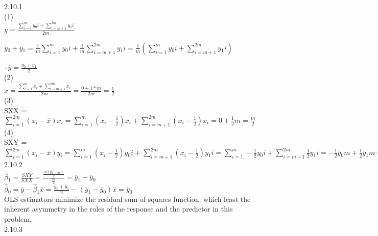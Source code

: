 \documentclass[12pt]{article}
\begin{document}
2.10.1\\

(1)\\

$\overline{y} = \frac{\sum_{i=1}^{m}y{_0}i + \sum_{i=m+1}^{2m}y{_1}i}{2m}$

$\overline{y}{_0} + \overline{y}{_1} = \frac{1}{m}\sum_{i=1}^{m}y{_0}i + \frac{1}{m}\sum_{i=m+1}^{2m}y{_1}i =  \frac{1}{m}({\sum_{i=1}^{m}y{_0}i + \sum_{i=m+1}^{2m}y{_1}i})$

$\therefore \overline{y} = \frac{\overline{y}{_0}+\overline{y}{_1}}{2}$\\

(2)\\

$\overline{x} = \frac{\sum_{i=1}^{m}x{_i} + \sum_{i=m+1}^{2m}x{_i}}{2m} = \frac{0+1*m}{2m} = \frac{1}{2}$\\

(3)\\

SXX = $\sum_{i=1}^{2m}(x{_i}-\overline{x})x{_i} = \sum_{i=1}^{m}(x{_i}-\frac{1}{2})x{_i} + \sum_{i=m+1}^{2m}(x{_i}-\frac{1}{2})x{_i} = 0 + \frac{1}{2}m = \frac{m}{2}$\\

(4)\\

SXY = $\sum_{i=1}^{2m}(x{_i}-\overline{x})y{_i} = \sum_{i=1}^{m}(x{_i}-\frac{1}{2})y{_0}i + \sum_{i=m+1}^{2m}(x{_i}-\frac{1}{2})y{_1}i = \sum_{i=1}^{m}-\frac{1}{2}y{_0}i + \sum_{i=m+1}^{2m}\frac{1}{2}y{_1}i = -\frac{1}{2}\overline{y}{_0}m + \frac{1}{2}\overline{y}{_1}m = \frac{m(\overline{y}{_1}-\overline{y}{_0})}{2}$\\

2.10.2\\

$\hat{\beta}{_1} = \frac{SXY}{SXX} = \frac{\frac{m(\overline{y}{_1}-\overline{y}{_0})}{2}}{\frac{m}{2}} = \overline{y}{_1} - \overline{y}{_0}$\\

$\hat{\beta}{_0} = \overline{y} - \hat{\beta}{_1}\overline{x} = \frac{\overline{y}{_0}+\overline{y}{_1}}{2} - (\overline{y}{_1} - \overline{y}{_0})\overline{x} = \overline{y}{_0}$\\

OLS estimators minimize the residual sum of squares function, which least the inherent asymmetry in the
roles of the response and the predictor in this problem.\\

2.10.3\\
\end{document}
